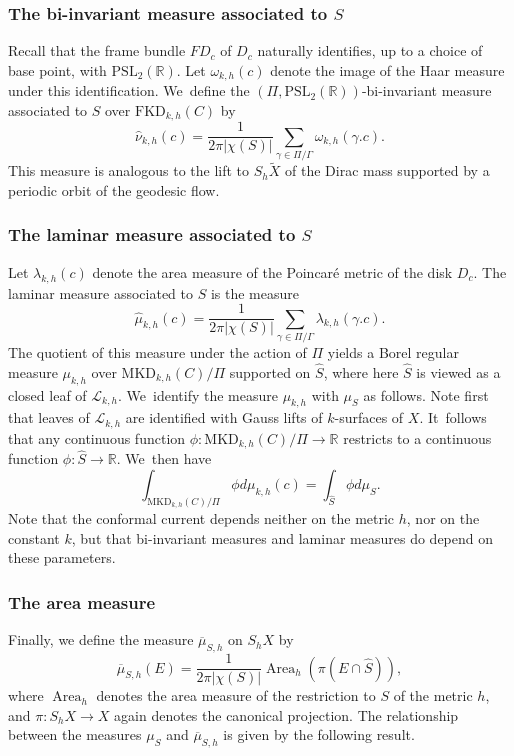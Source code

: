 \documentclass[10pt]{amsart}
\newcommand{\ksurfaces}{$k$\nobreakdash-surfaces\xspace}
\theoremstyle{plain}
\theoremstyle{definition}
\newcommand\PSL{\mathrm{PSL}_2(\mathbb{R})}
\newcommand{\R}{{\mathbb R}}
\newcommand{\cL}{{\mathcal L}}
\newcommand{\MKD}{\mathrm{MKD}}
\newcommand{\FKD}{\mathrm{FKD}}
\DeclareMathOperator{\Area}{Area}
\begin{document}
\subsubsection*{The bi-invariant measure associated to $S$}
Recall that the frame bundle $FD_c$ of $D_c$ naturally identifies, up to a choice of base point, with $\PSL$. Let $\omega_{k,h}(c)$ denote the image of the Haar measure under this identification. We~define the $(\Pi,\PSL)$-bi-invariant measure associated to $S$ over $\FKD_{k,h}(C)$ by
\begin{equation*}
\hat\nu_{k,h}(c)=\frac{1}{2\pi|\chi(S)|}\sum_{\gamma\in\Pi/\Gamma}\omega_{k,h}(\gamma.c).
\end{equation*}
This measure is analogous to the lift to $S_h \tilde X$ of the Dirac mass supported by a periodic orbit of the geodesic flow.

\subsubsection*{The laminar measure associated to $S$} Let $\lambda_{k,h}(c)$ denote the area measure of the Poincaré metric of the disk $D_c$. The laminar measure associated to $S$ is the measure
\begin{equation*}
\hat\mu_{k,h}(c)=\frac{1}{2\pi|\chi(S)|}\sum_{\gamma\in\Pi/\Gamma}\lambda_{k,h}(\gamma.c).
\end{equation*}
The quotient of this measure under the action of $\Pi$ yields a Borel regular measure $\mu_{k,h}$ over $\MKD_{k,h}(C)/\Pi$ supported on $\hat S$, where here $\hat S$ is viewed as a closed leaf of $\cL_{k,h}$. We~identify the measure $\mu_{k,h}$ with $\mu_S$ as follows. Note first that leaves of $\cL_{k,h}$ are identified with Gauss lifts of \ksurfaces of $X$. It~follows that any continuous function $\phi:\MKD_{k,h}(C)/\Pi\to\R$ restricts to a continuous function $\phi:\hat S\to\R$. We~then have
\begin{equation}\label{eq.ident_measures}
\int_{\MKD_{k,h}(C)/\Pi} \phi d\mu_{k,h}(c)=\int_{\hat S}\phi d\mu_S.
\end{equation}
Note that the conformal current depends neither on the metric $h$, nor on the constant $k$, but that bi-invariant measures and laminar measures do depend on these parameters.

\subsubsection*{The area measure} Finally, we define the measure $\overline{\mu}_{S,h}$ on $S_hX$ by
\begin{equation}\label{eq.area_measure}
\overline{\mu}_{S,h}(E)=\frac{1}{2\pi|\chi(S)|}\Area_h(\pi(E\cap\hat S)),
\end{equation}
where $\Area_h$ denotes the area measure of the restriction to $S$ of the metric $h$, and $\pi:S_hX\to X$ again denotes the canonical projection. The relationship between the measures $\mu_S$ and $\overline\mu_{S,h}$ is given by the following result.
\end{document}
